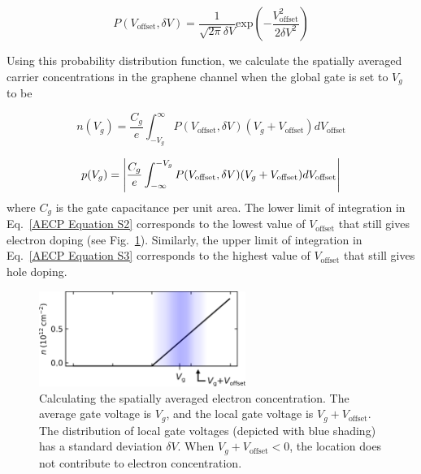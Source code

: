 \documentclass{beavtex_dub_edit}
\begin{document}
\begin{equation}
    P(V_{\mathrm{offset}}, \delta V) = \frac{1}{\sqrt{2 \pi}\delta V}\mathrm{exp}\left(-\frac{V_{\mathrm{offset}}^2}{2\delta V^2}\right)
    \label{AECP Equation S1}
\end{equation}

Using this probability distribution function, we calculate the spatially averaged carrier concentrations in the graphene channel when the global gate is set to $V_g$ to be


\begin{equation}
    n(V_g) = \frac{C_g}{e}\int_{-V_g}^{\infty}P(V_{\mathrm{offset}}, \delta V)(V_g + V_{\mathrm{offset}})dV_{\mathrm{offset}}
    \label{AECP Equation S2}
\end{equation}

\begin{equation}
    p(V_g) = \abs{\frac{C_g}{e}\int_{-\infty}^{-V_g}P(V_{\mathrm{offset}}, \delta V)(V_g + V_{\mathrm{offset}})dV_{\mathrm{offset}}}
    \label{AECP Equation S3}
\end{equation}
where $C_g$ is the gate capacitance per unit area. The lower limit of integration in Eq.\ \ref{AECP Equation S2} corresponds to the lowest value of $V_{\mathrm{offset}}$ that still gives electron doping (see Fig.\ \ref{AECP Figure S2}). Similarly, the upper limit of integration in Eq.\ \ref{AECP Equation S3} corresponds to the highest value of $V_{\mathrm{offset}}$ that still gives hole doping.

\begin{figure}
    \includegraphics[width = 0.6\textwidth]{Figure S2, V_offset.png}
    \caption{Calculating the spatially averaged electron concentration. The average gate voltage is $V_g$, and the local gate voltage is $V_g + V_{\mathrm{offset}}$. The distribution of local gate voltages (depicted with blue shading) has a standard deviation $\delta V$. When $V_g + V_{\mathrm{offset}} < 0$, the location does not contribute to electron concentration.}
    \label{AECP Figure S2}
\end{figure}
\end{document}
